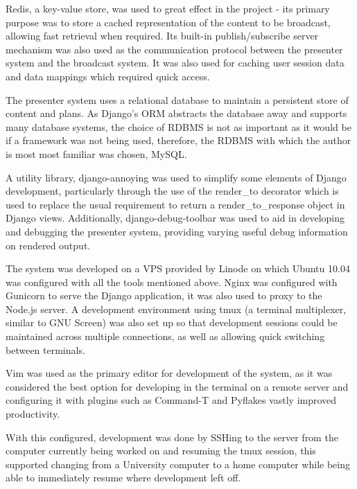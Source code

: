 \documentclass[a4papert,11pt,notitlepage]{article}
\begin{document}
Redis\cite{redis:web}, a key-value store, was used to great effect in the project - its primary purpose was to store a cached representation of the content to be broadcast, allowing fast retrieval when required. Its built-in publish/subscribe server mechanism was also used as the communication protocol between the presenter system and the broadcast system. It was also used for caching user session data and data mappings which required quick access.

The presenter system uses a relational database to maintain a persistent store of content and plans. As Django's ORM abstracts the database away and supports many database systems, the choice of RDBMS is not as important as it would be if a framework was not being used, therefore, the RDBMS with which the author is most most familiar was chosen, MySQL\cite{mysql:web}.

A utility library, django-annoying\cite{djangoannoying:web} was used to simplify some elements of Django development, particularly through the use of the render\_to decorator which is used to replace the usual requirement to return a render\_to\_response object in Django views. Additionally, django-debug-toolbar\cite{debugtoolbar:web} was used to aid in developing and debugging the presenter system, providing varying useful debug information on rendered output.

The system was developed on a VPS provided by Linode\cite{linode:web} on which Ubuntu 10.04\cite{ubuntu:web} was configured with all the tools mentioned above. Nginx\cite{nginx:web} was configured with Gunicorn\cite{gunicorn:web} to serve the Django application, it was also used to proxy to the Node.js server. A development environment using tmux\cite{tmux:web} (a terminal multiplexer, similar to GNU Screen) was also set up so that development sessions could be maintained across multiple connections, as well as allowing quick switching between terminals.

Vim\cite{vim:web} was used as the primary editor for development of the system, as it was considered the best option for developing in the terminal on a remote server and configuring it with plugins such as Command-T\cite{commandt:web} and Pyflakes\cite{pyflakes:web} vastly improved productivity.

With this configured, development was done by SSHing to the server from the computer currently being worked on and resuming the tmux session, this supported changing from a University computer to a home computer while being able to immediately resume where development left off.
\end{document}
